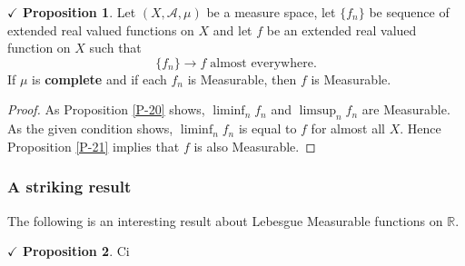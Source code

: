 \documentclass{article}
\theoremstyle{definition}
\theoremstyle{remark}
\theoremstyle{definition}
\theoremstyle{definition}
\newtheorem{proposition}{$\checkmark$ Proposition}
\theoremstyle{definition}
\newcommand{\R}{\mathbb{R}}
\newcommand{\alg}[1]{\mathscr{#1}}
\begin{document}
\hrulefill
\begin{proposition}
	Let $ (X,\alg{A},\mu) $ be a measure space, let $ \{f_n\} $ be sequence of extended real valued functions on $ X $ and let $ f $ be an extended real valued function on $ X $ such that
	\[\{f_n\}\longrightarrow f\;\text{almost everywhere.}\]
	If $ \mu  $ is \textbf{complete} and if each $ f_n $ is Measurable, then $ f $ is Measurable.
\end{proposition}
\begin{proof}
	As Proposition \ref{P-20} shows, $ \liminf_n f_n $ and $ \limsup_{n} f_n $ are Measurable. As the given condition shows, $ \liminf_{n}f_n $ is equal to $ f $ for almost all $ X $. Hence Proposition \ref{P-21} implies that $ f $ is also Measurable.
\end{proof}
\hrulefill
\subsubsection{A striking result}
The following is an interesting result about Lebesgue Measurable functions on $ \R $.
\begin{proposition}
	Ci
\end{proposition}
\newpage
\end{document}
